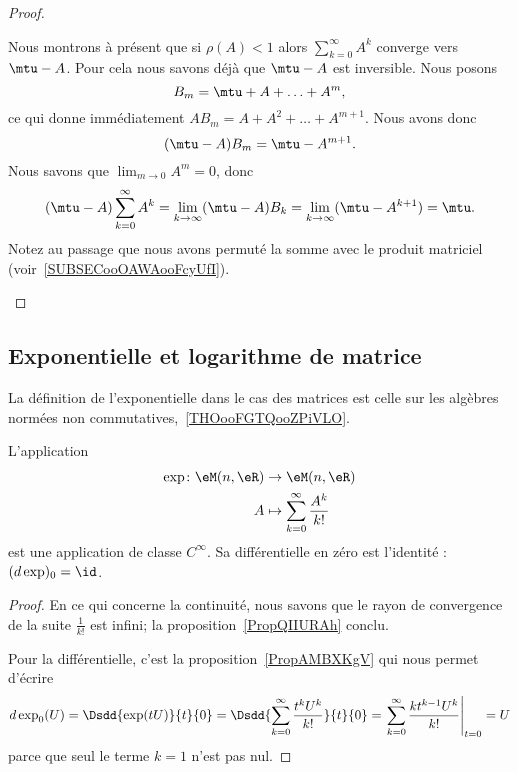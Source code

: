 \begin{proof}
\begin{subproof}
		\spitem[Le reste]
		Nous montrons à présent que si \( \rho(A)<1\) alors \( \sum_{k=0}^{\infty}A^k\) converge vers \(\mtu-A\). Pour cela nous savons déjà que \( \mtu-A\) est inversible. Nous posons
		\begin{equation}
			B_m=\mtu+A+\ldots +A^m,
		\end{equation}
		ce qui donne immédiatement \( AB_m=A+A^2+\ldots +A^{m+1}\). Nous avons donc
		\begin{equation}
			(\mtu-A)B_m=\mtu-A^{m+1}.
		\end{equation}
		Nous savons que \( \lim_{m\to0}A^m=0\), donc
		\begin{equation}
			(\mtu-A)\sum_{k=0}^{\infty}A^k=\lim_{k\to \infty} (\mtu-A)B_k=\lim_{k\to \infty} (\mtu-A^{k+1})=\mtu.
		\end{equation}
		Notez au passage que nous avons permuté la somme avec le produit matriciel (voir~\ref{SUBSECooOAWAooFcyUfI}).
	\end{subproof}
\end{proof}

\subsection{Exponentielle et logarithme de matrice}
\label{subsecXNcaQfZ}

La définition de l'exponentielle dans le cas des matrices est celle sur les algèbres normées non commutatives,~\ref{THOooFGTQooZPiVLO}.
\begin{proposition} \label{PropXFfOiOb}
	L'application
	\begin{equation}
		\begin{aligned}
			\exp\colon \eM(n,\eR) & \to \eM(n,\eR)                                \\
			A                     & \mapsto \sum_{k=0}^{\infty}\frac{ A^k }{ k! }
		\end{aligned}
	\end{equation}
	est une application de classe \(  C^{\infty}\). Sa différentielle en zéro est l'identité : \( (d\exp)_0=\id\).
\end{proposition}

\begin{proof}
	En ce qui concerne la continuité, nous savons que le rayon de convergence de la suite \( \frac{1}{ k! }\) est infini; la proposition~\ref{PropQIIURAh} conclu.

	Pour la différentielle, c'est la proposition~\ref{PropAMBXKgV} qui nous permet d'écrire
	\begin{equation}
		d\exp_0(U)=\Dsdd{ \exp(tU) }{t}{0}=\Dsdd{ \sum_{k=0}^{\infty}\frac{ t^kU^k }{ k! } }{t}{0}=\left. \sum_{k=0}^{\infty}\frac{ kt^{k-1}U^k }{ k! }\right|_{t=0}=U
	\end{equation}
	parce que seul le terme \( k=1\) n'est pas nul.
\end{proof}

